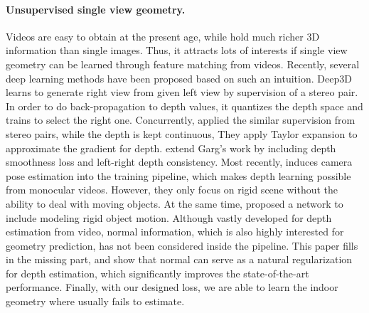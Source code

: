 \paragraph{Unsupervised single view geometry.}
Videos are easy to obtain at the present age, while hold much richer 3D information than single images. Thus, it attracts lots of interests if single view geometry can be learned through feature matching from videos. Recently, several deep learning methods have been proposed based on such an intuition. Deep3D \cite{xie2016deep3d} learns to generate right view from given left view by supervision of a stereo pair. In order to do back-propagation to depth values, it quantizes the depth space and trains to select the right one. 
Concurrently, \cite{GargBR16} applied the similar supervision from stereo pairs, while the depth is kept continuous, They apply Taylor expansion to approximate the gradient for depth. \cite{godard2016unsupervised} extend Garg's work by including depth smoothness loss and left-right depth consistency. Most recently, \cite{zhou2017unsupervised} induces camera pose estimation into the training pipeline, which makes depth learning possible from monocular videos. However, they only focus on rigid scene without the ability to deal with moving objects. At the same time, \cite{kuznietsov2017semi} proposed a network to include modeling rigid object motion. Although vastly developed for depth estimation from video, normal information, which is also highly interested for geometry prediction, has not been considered inside the pipeline. This paper fills in the missing part, and show that normal can serve as a natural regularization for depth estimation, which significantly improves the state-of-the-art performance. Finally, with our designed loss, we are able to  learn the indoor geometry where \cite{zhou2017unsupervised} usually fails to estimate.

